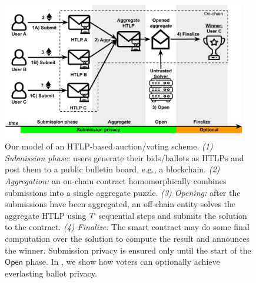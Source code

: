 \begin{figure}[tb]
    \centering
    \includegraphics[width=0.95\textwidth]{cicada/figs/cicada-explainer.pdf}
    \caption{Our model of an HTLP-based auction/voting scheme. \emph{(1) Submission phase:} users generate their bids/ballots as HTLPs and post them to a public bulletin board, e.g., a blockchain. \emph{(2) Aggregation:} an on-chain contract homomorphically combines submissions into a single aggregate puzzle. \emph{(3) Opening:} after the submissions have been aggregated, an off-chain entity solves the aggregate HTLP using $T$ sequential steps and submits the solution to the contract. \emph{(4) Finalize:} The smart contract may do some final computation over the solution to compute the result and announces the winner. Submission privacy is ensured only until the start of the $\mathsf{Open}$ phase. 
    In , we show how voters can optionally achieve everlasting ballot privacy.
    } %
    \label{fig:cicada-explainer}
\end{figure}
